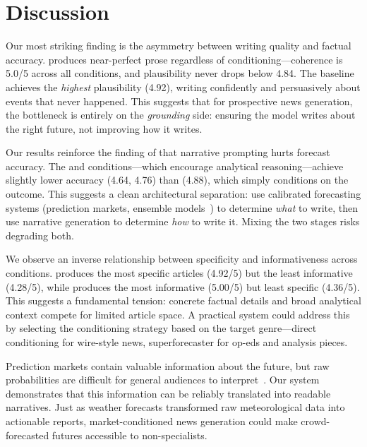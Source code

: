\section{Discussion}
\label{sec:discussion}

 Our most striking finding is the asymmetry between writing quality and factual accuracy. \gptfour produces near-perfect prose regardless of conditioning---coherence is 5.0/5 across all conditions, and plausibility never drops below 4.84. The \nomarket baseline achieves the \emph{highest} plausibility (4.92), writing confidently and persuasively about events that never happened. This suggests that for prospective news generation, the bottleneck is entirely on the \emph{grounding} side: ensuring the model writes about the right future, not improving how it writes.

 Our results reinforce the finding of \citet{lu2025} that narrative prompting hurts forecast accuracy. The \mcp and \superforecaster conditions---which encourage analytical reasoning---achieve slightly lower accuracy (4.64, 4.76) than \directmarket (4.88), which simply conditions on the outcome. This suggests a clean architectural separation: use calibrated forecasting systems (prediction markets, ensemble models~\citep{aiaforecaster2025}) to determine \emph{what} to write, then use narrative generation to determine \emph{how} to write it. Mixing the two stages risks degrading both.

 We observe an inverse relationship between specificity and informativeness across conditions. \directmarket produces the most specific articles (4.92/5) but the least informative (4.28/5), while \superforecaster produces the most informative (5.00/5) but least specific (4.36/5). This suggests a fundamental tension: concrete factual details and broad analytical context compete for limited article space. A practical system could address this by selecting the conditioning strategy based on the target genre---direct conditioning for wire-style news, superforecaster for op-eds and analysis pieces.

 Prediction markets contain valuable information about the future, but raw probabilities are difficult for general audiences to interpret~\citep{wolfers2004prediction}. Our system demonstrates that this information can be reliably translated into readable narratives. Just as weather forecasts transformed raw meteorological data into actionable reports, market-conditioned news generation could make crowd-forecasted futures accessible to non-specialists.


